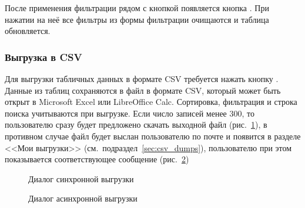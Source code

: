 После применения фильтрации рядом с кнопкой  появляется кнопка .
При нажатии на неё все фильтры из формы фильтрации очищаются и таблица обновляется. 

\subsubsection{Выгрузка в CSV}

Для выгрузки табличных данных в формате CSV требуется нажать кнопку . Данные из таблиц
сохраняются в файл в формате CSV, который может быть открыт в Microsoft Excel или LibreOffice Calc. Сортировка, фильтрация и строка
поиска учитываются при выгрузке. Если число записей менее 300, то пользователю сразу будет предложено скачать выходной файл 
(рис.~\ref{img:datatables:csv_sync}), в противном случае файл будет выслан пользователю по почте и появится в разделе <<Мои выгрузки>>
(см.\ подраздел~\ref{sec:csv_dumps}), пользователю при этом показывается соответствующее сообщение (рис.~\ref{img:datatables:csv_async})

\begin{figure}[H]
	\caption{Диалог синхронной выгрузки}
	\label{img:datatables:csv_sync}
\end{figure}

\begin{figure}[H]
	\caption{Диалог асинхронной выгрузки}
	\label{img:datatables:csv_async}
\end{figure}